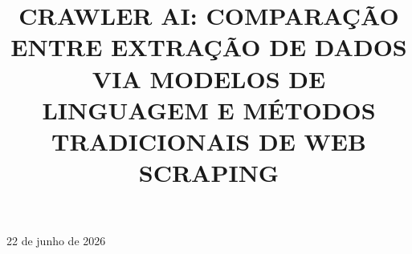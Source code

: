 \documentclass[tcc,capa]{texifsul}
\title{CRAWLER AI: COMPARAÇÃO ENTRE EXTRAÇÃO DE DADOS VIA MODELOS DE LINGUAGEM E MÉTODOS TRADICIONAIS DE WEB SCRAPING}
\author{}{Felipe Machado Schultz}
\begin{document}
\maketitle

\sloppy

\begin{aprovacao}{22 de junho de 2026}
\end{aprovacao}



\begin{abstract}
\noindent
\end{abstract}

\begin{englishabstract}
\noindent
\end{englishabstract}

\listoffigures
\listoftables
\end{document}
